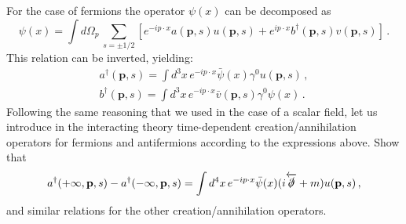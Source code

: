 \documentclass[12pt,a4paper]{article}
\begin{document}
\begin{enumerate}
    For the case of fermions the operator $\psi(x)$ can be decomposed
    as
    \[
    \psi(x) = \int d\Omega_p\, \sum_{s=\pm1/2} \left[
      e^{-i p\cdot x} a(\mathbf{p},s) u(\mathbf{p},s) + 
      e^{i p\cdot x} b^\dagger(\mathbf{p},s) v(\mathbf{p},s)
      \right]\, .
    \]
    This relation can be inverted, yielding:
    \begin{align}
      a^\dagger(\mathbf{p},s) = \int d^3x\, e^{-ip\cdot x}
      \bar{\psi}(x) \gamma^0 u(\mathbf{p},s) \, , \nonumber \\
      b^\dagger(\mathbf{p},s) = \int d^3x\, e^{-ip\cdot x}
      \bar{v}(\mathbf{p},s) \gamma^0 \psi(x) \, . \nonumber 
    \end{align}
    Following the same reasoning that we used in the case of a scalar
    field, let us introduce in the interacting theory time-dependent
    creation/annihilation operators for fermions and antifermions
    according to the expressions above. 
    Show that
    \begin{align}
      \label{eq:3}
      a^\dagger(+\infty,\mathbf{p},s) - 
      a^\dagger(-\infty,\mathbf{p},s) = 
      \int d^4x\,
      e^{-ip\cdot x} \bar\psi(x)
      (i\overleftarrow{\slashed{\partial}}+m) u(\mathbf{p},s)\, ,
    \end{align}
    and similar relations for the other creation/annihilation
    operators. 
 

\end{enumerate}
\end{document}
